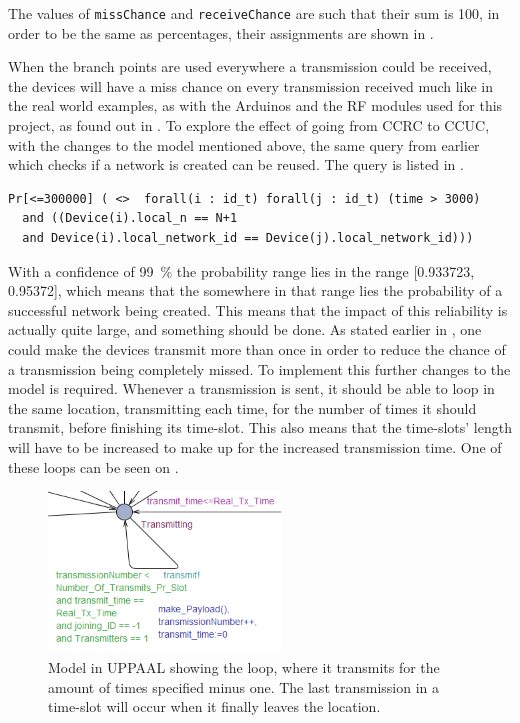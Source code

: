 \noindent
The values of \texttt{missChance} and \texttt{receiveChance} are such that their sum is 100, in order to be the same as percentages, their assignments are shown in .

When the branch points are used everywhere a transmission could be received, the devices will have a miss chance on every transmission received much like in the real world examples, as with the Arduinos and the RF modules used for this project, as found out in .
To explore the effect of going from CCRC to CCUC, with the changes to the model mentioned above, the same query from earlier which checks if a network is created can be reused. 
The query is listed in .

\begin{lstlisting}[style=UPPAAL, caption={Query for UPPAAL which asks for the probability of all devices in a network being equal to the number of devices in the system, and that they all have the same \texttt{network\_id}}, label={query-SuccesfulCreate}]
Pr[<=300000] ( <>  forall(i : id_t) forall(j : id_t) (time > 3000) 
  and ((Device(i).local_n == N+1 
  and Device(i).local_network_id == Device(j).local_network_id)))
\end{lstlisting}

\noindent
With a confidence of 99~\% the probability range lies in the range [0.933723, 0.95372], which means that the somewhere in that range lies the probability of a successful network being created.
This means that the impact of this reliability is actually quite large, and something should be done.
As stated earlier in , one could make the devices transmit more than once in order to reduce the chance of a transmission being completely missed.
To implement this further changes to the model is required.
Whenever a transmission is sent, it should be able to loop in the same location, transmitting each time, for the number of times it should transmit, before finishing its time-slot. 
This also means that the time-slots' length will have to be increased to make up for the increased transmission time.
One of these loops can be seen on .

\begin{figure}
\vspace{12pt}
\centering
  \includegraphics[width=0.55\textwidth]{Figures/Model/Transmit_Loop.PNG} 
\caption{Model in UPPAAL showing the loop, where it transmits for the amount of times specified minus one. The last transmission in a time-slot will occur when it finally leaves the location.}
\label{LoopTransmitUPPAAL}
\end{figure}

